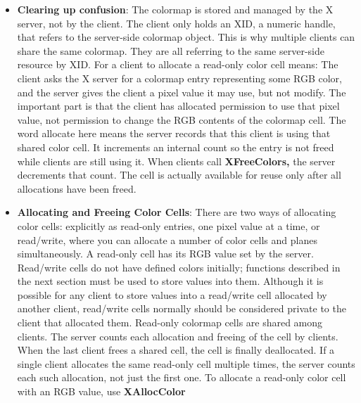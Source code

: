 \documentclass{report}
\begin{document}
\begin{itemize}
        \item \textbf{Clearing up confusion}: The colormap is stored and managed by the X server, not by the client.
            \bigbreak \noindent 
            The client only holds an XID, a numeric handle, that refers to the server-side colormap object.
            \bigbreak \noindent 
            This is why multiple clients can share the same colormap. They are all referring to the same server-side resource by XID.
            \bigbreak \noindent 
            For a client to allocate a read-only color cell means: The client asks the X server for a colormap entry representing some RGB color, and the server gives the client a pixel value it may use, but not modify.
            \bigbreak \noindent 
            The important part is that the client has allocated permission to use that pixel value, not permission to change the RGB contents of the colormap cell.
            \bigbreak \noindent 
            The word allocate here means the server records that this client is using that shared color cell. It increments an internal count so the entry is not freed while clients are still using it.
            \bigbreak \noindent 
            When clients call \textbf{XFreeColors,} the server decrements that count. The cell is actually available for reuse only after all allocations have been freed.
        \item \textbf{Allocating and Freeing Color Cells}: There are two ways of allocating color cells: explicitly as read-only entries, one pixel value at a time, or read/write, where you can allocate a number of color cells and planes simultaneously. A read-only cell has its RGB value set by the server. Read/write cells do not have defined colors initially; functions described in the next section must be used to store values into them. Although it is possible for any client to store values into a read/write cell allocated by another client, read/write cells normally should be considered private to the client that allocated them.
            \bigbreak \noindent 
            Read-only colormap cells are shared among clients. The server counts each allocation and freeing of the cell by clients. When the last client frees a shared cell, the cell is finally deallocated. If a single client allocates the same read-only cell multiple times, the server counts each such allocation, not just the first one.
            \bigbreak \noindent 
            To allocate a read-only color cell with an RGB value, use \textbf{XAllocColor}
            \bigbreak \noindent 
            \begin{cppcode}

\end{cppcode}
\end{itemize}
\end{document}
